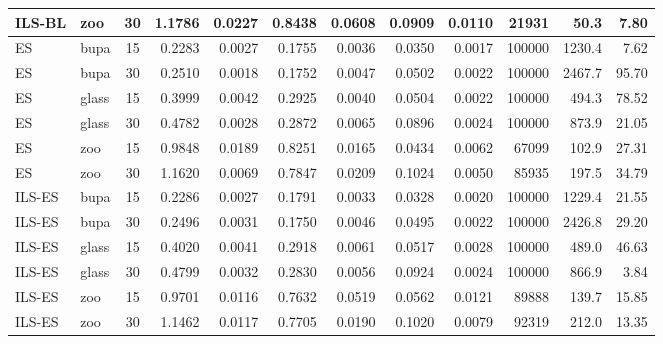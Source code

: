 \begin{longtable}{llcrrrrrrrrr}
    ILS-BL & zoo & 30 & 1.1786 & 0.0227 & 0.8438 & 0.0608 & 0.0909 & 0.0110 & 21931 & 50.3 & 7.80 \\
    \midrule
    ES & bupa & 15 & 0.2283 & 0.0027 & 0.1755 & 0.0036 & 0.0350 & 0.0017 & 100000 & 1230.4 & 7.62 \\
    ES & bupa & 30 & 0.2510 & 0.0018 & 0.1752 & 0.0047 & 0.0502 & 0.0022 & 100000 & 2467.7 & 95.70 \\
    ES & glass & 15 & 0.3999 & 0.0042 & 0.2925 & 0.0040 & 0.0504 & 0.0022 & 100000 & 494.3 & 78.52 \\
    ES & glass & 30 & 0.4782 & 0.0028 & 0.2872 & 0.0065 & 0.0896 & 0.0024 & 100000 & 873.9 & 21.05 \\
    ES & zoo & 15 & 0.9848 & 0.0189 & 0.8251 & 0.0165 & 0.0434 & 0.0062 & 67099 & 102.9 & 27.31 \\
    ES & zoo & 30 & 1.1620 & 0.0069 & 0.7847 & 0.0209 & 0.1024 & 0.0050 & 85935 & 197.5 & 34.79 \\
    \midrule
    ILS-ES & bupa & 15 & 0.2286 & 0.0027 & 0.1791 & 0.0033 & 0.0328 & 0.0020 & 100000 & 1229.4 & 21.55 \\
    ILS-ES & bupa & 30 & 0.2496 & 0.0031 & 0.1750 & 0.0046 & 0.0495 & 0.0022 & 100000 & 2426.8 & 29.20 \\
    ILS-ES & glass & 15 & 0.4020 & 0.0041 & 0.2918 & 0.0061 & 0.0517 & 0.0028 & 100000 & 489.0 & 46.63 \\
    ILS-ES & glass & 30 & 0.4799 & 0.0032 & 0.2830 & 0.0056 & 0.0924 & 0.0024 & 100000 & 866.9 & 3.84 \\
    ILS-ES & zoo & 15 & 0.9701 & 0.0116 & 0.7632 & 0.0519 & 0.0562 & 0.0121 & 89888 & 139.7 & 15.85 \\
    ILS-ES & zoo & 30 & 1.1462 & 0.0117 & 0.7705 & 0.0190 & 0.1020 & 0.0079 & 92319 & 212.0 & 13.35 \\
\end{longtable}
\endgroup